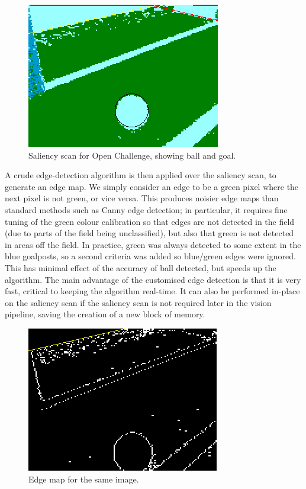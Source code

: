 \documentclass[pdftex,11pt,a4paper]{report}
\begin{document}
\begin{figure}[ht]
    \begin{center}
        \includegraphics{figures/bwSaliency}
    \end{center}
    \caption{Saliency scan for Open Challenge, showing ball and goal.}
    \label{fig:bwSaliency}
\end{figure}

A crude edge-detection algorithm is then applied over the saliency scan, to
generate an edge map. We simply consider an edge to be a green pixel where
the next pixel is not green, or vice versa. This produces noisier edge maps
than standard methods such as Canny edge detection; in particular, it
requires fine tuning of the green colour calibration so that edges are not
detected in the field (due to parts of the field being unclassified), but
also that green is not detected in areas off the field. In practice, green
was always detected to some extent in the blue goalposts, so a second
criteria was added so blue/green edges were ignored. This has minimal
effect of the accuracy of ball detected, but speeds up the algorithm.  The
main advantage of the customised edge detection is that it is very fast,
critical to keeping the algorithm real-time. It can also be performed
in-place on the saliency scan if the saliency scan is not required later in
the vision pipeline, saving the creation of a new block of memory. 

\begin{figure}[ht]
    \begin{center}
        \includegraphics{figures/bwEdge}
    \end{center}
    \caption{Edge map for the same image.}
    \label{fig:bwEdge}
\end{figure}
\end{document}
